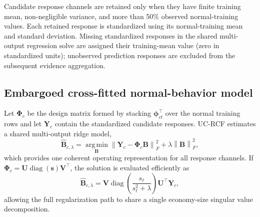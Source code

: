 Candidate response channels are retained only when they have finite training
mean, non-negligible variance, and more than 50\% observed normal-training
values. Each retained response is standardized using its normal-training mean
and standard deviation. Missing standardized responses in the shared
multi-output regression solve are assigned their training-mean value (zero in
standardized units); unobserved prediction responses are excluded from the
subsequent evidence aggregation.

\subsection{Embargoed cross-fitted normal-behavior model}

Let $\mathbf{\Phi}_c$ be the design matrix formed by stacking
$\boldsymbol{\phi}_{ct}^{\top}$ over the normal training rows and let
$\mathbf{Y}_c$ contain the standardized candidate responses. UC-RCF estimates a
shared multi-output ridge model,
\begin{equation}
\widehat{\mathbf{B}}_{c,\lambda}
=\underset{\mathbf{B}}{\operatorname*{arg\,min}}
\left\|\mathbf{Y}_c-\mathbf{\Phi}_c\mathbf{B}\right\|_F^2
+\lambda\left\|\mathbf{B}\right\|_F^2,
\label{eq:ridge_objective}
\end{equation}
which provides one coherent operating representation for all response channels.
If $\mathbf{\Phi}_c=\mathbf{U}\operatorname{diag}(\mathbf{s})\mathbf{V}^{\top}$,
the solution is evaluated efficiently as
\begin{equation}
\widehat{\mathbf{B}}_{c,\lambda}
=\mathbf{V}\operatorname{diag}\!\left(
\frac{s_{\ell}}{s_{\ell}^{2}+\lambda}
\right)\mathbf{U}^{\top}\mathbf{Y}_c,
\label{eq:ridge_svd}
\end{equation}
allowing the full regularization path to share a single economy-size singular
value decomposition.

